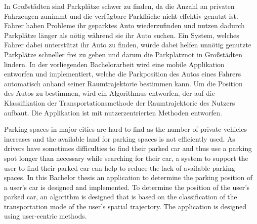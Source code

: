 \begin{abstractDE}

In Großstädten sind Parkplätze schwer zu finden, da die Anzahl an privaten Fahrzeugen zunimmt und die verfügbare Parkfläche nicht effektiv genutzt ist. Fahrer haben Probleme ihr geparktes Auto wiederzufinden und nutzen dadurch Parkplätze länger als nötig während sie ihr Auto suchen. Ein System, welches Fahrer dabei unterstützt ihr Auto zu finden, würde dabei helfen unnötig genutzte Parkplätze schneller frei zu geben und darum die Parkplatznot in Großstädten lindern. In der vorliegenden Bachelorarbeit wird eine mobile Applikation entworfen und implementiert, welche die Parkposition des Autos eines Fahrers automatisch anhand seiner Raumtrajektorie bestimmen kann. Um die Position des Autos zu bestimmen, wird ein Algorithmus entworfen, der auf die Klassifikation der Transportationsmethode der Raumtrajektorie des Nutzers aufbaut. Die Applikation ist mit nutzerzentrierten Methoden entworfen.

\end{abstractDE}

\vfill

\begin{abstractEN}

Parking spaces in major cities are hard to find as the number of private vehicles increases and the available land for parking spaces is not efficiently used. As drivers have sometimes difficulties to find their parked car and thus use a parking spot longer than necessary while searching for their car, a system to support the user to find their parked car can help to reduce the lack of available parking spaces. In this Bachelor thesis an application to determine the parking position of a user's car is designed and implemented. To determine the position of the user's parked car, an algorithm is designed that is based on the classification of the transportation mode of the user's spatial trajectory. The application is designed using user-centric methods. 

\end{abstractEN}

\vfill